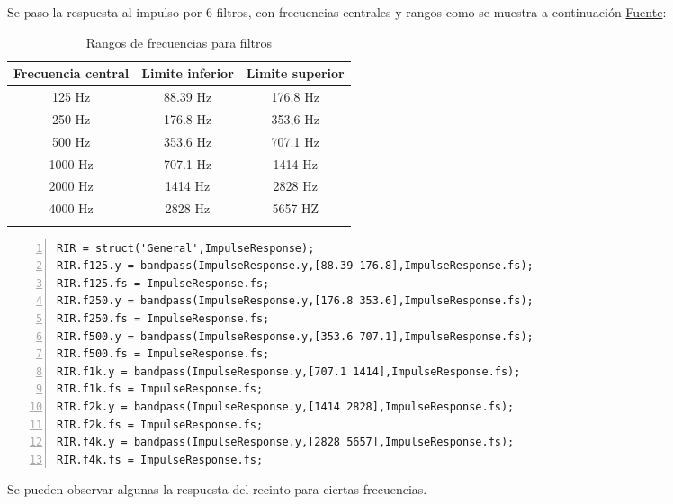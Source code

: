 Se paso la respuesta al impulso por 6 filtros, con frecuencias centrales y rangos como se muestra a continuación \href{https://www.doctorproaudio.com/content.php?2402-octaves-and-third-octaves#:~:text=As%20a%20reference%2C%20the%20central,exactly%20to%20double%20or%20half.}{Fuente}:
\begin{center}
    \begin{longtable}[!htb]{ |c|c|c| }
    \hline
    Frecuencia central & Limite inferior & Limite superior \\
    \hline
    125 Hz & 88.39 Hz & 176.8 Hz \\
    250 Hz & 176.8 Hz & 353,6 Hz \\
    500 Hz & 353.6 Hz & 707.1 Hz \\
    1000 Hz & 707.1 Hz & 1414 Hz \\
    2000 Hz & 1414 Hz & 2828 Hz \\
    4000 Hz & 2828 Hz & 5657 HZ \\
    \hline
    \caption{Rangos de frecuencias para filtros}
    \label{tab:Rangos De Frecuencias}
    \end{longtable} 
\end{center}
\begin{lstlisting}[frame=single,numbers=left, style=Matlab-editor, basicstyle=\tiny]
RIR = struct('General',ImpulseResponse); 
RIR.f125.y = bandpass(ImpulseResponse.y,[88.39 176.8],ImpulseResponse.fs);
RIR.f125.fs = ImpulseResponse.fs;
RIR.f250.y = bandpass(ImpulseResponse.y,[176.8 353.6],ImpulseResponse.fs);
RIR.f250.fs = ImpulseResponse.fs;
RIR.f500.y = bandpass(ImpulseResponse.y,[353.6 707.1],ImpulseResponse.fs);
RIR.f500.fs = ImpulseResponse.fs;
RIR.f1k.y = bandpass(ImpulseResponse.y,[707.1 1414],ImpulseResponse.fs);
RIR.f1k.fs = ImpulseResponse.fs;
RIR.f2k.y = bandpass(ImpulseResponse.y,[1414 2828],ImpulseResponse.fs);
RIR.f2k.fs = ImpulseResponse.fs;
RIR.f4k.y = bandpass(ImpulseResponse.y,[2828 5657],ImpulseResponse.fs);
RIR.f4k.fs = ImpulseResponse.fs;
\end{lstlisting}
Se pueden observar algunas la respuesta del recinto para ciertas frecuencias.
